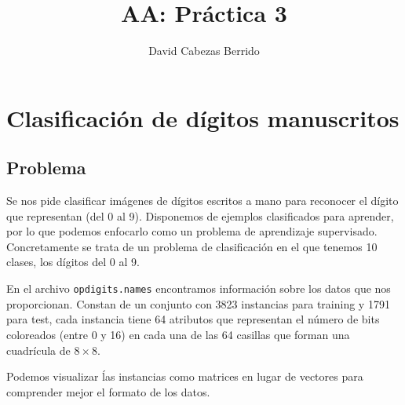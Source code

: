 \documentclass[a4]{article}
\title{AA: Práctica 3}
\author{David Cabezas Berrido}
\date{}
\begin{document}
\maketitle
\tableofcontents

\newpage

\section{Clasificación de dígitos manuscritos}

\subsection{Problema}

Se nos pide clasificar imágenes de dígitos escritos a mano para
reconocer el dígito que representan (del 0 al 9). Disponemos de
ejemplos clasificados para aprender, por lo que podemos enfocarlo como
un problema de aprendizaje supervisado. Concretamente se trata de un
problema de clasificación en el que tenemos 10 clases, los dígitos del
0 al 9.

En el archivo \texttt{opdigits.names} encontramos información sobre
los datos que nos proporcionan. Constan de un conjunto con 3823
instancias para training y 1791 para test, cada instancia tiene 64
atributos que representan el número de bits coloreados (entre 0 y 16)
en cada una de las 64 casillas que forman una cuadrícula de
$8\times 8$.

Podemos visualizar ĺas instancias como matrices en lugar de vectores
para comprender mejor el formato de los datos.
\end{document}
